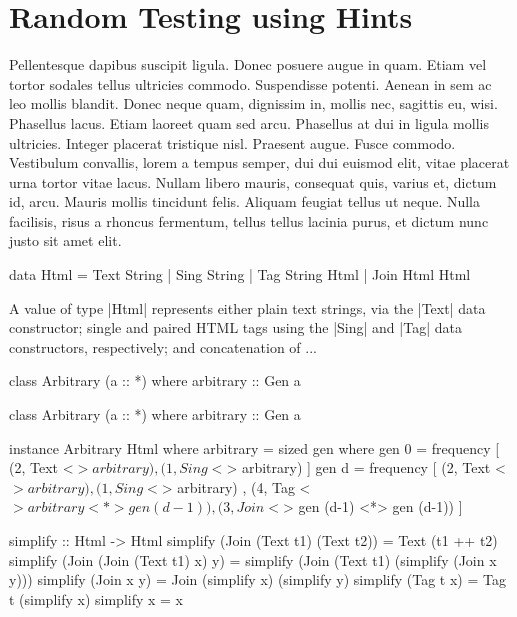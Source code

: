 \section{Random Testing using Hints}
\label{sec:sources}


Pellentesque dapibus suscipit ligula. Donec posuere augue in quam. Etiam vel
tortor sodales tellus ultricies commodo. Suspendisse potenti. Aenean in sem ac
leo mollis blandit. Donec neque quam, dignissim in, mollis nec, sagittis eu,
wisi. Phasellus lacus. Etiam laoreet quam sed arcu. Phasellus at dui in ligula
mollis ultricies. Integer placerat tristique nisl. Praesent augue. Fusce
commodo. Vestibulum convallis, lorem a tempus semper, dui dui euismod elit,
vitae placerat urna tortor vitae lacus. Nullam libero mauris, consequat quis,
varius et, dictum id, arcu. Mauris mollis tincidunt felis. Aliquam feugiat
tellus ut neque. Nulla facilisis, risus a rhoncus fermentum, tellus tellus
lacinia purus, et dictum nunc justo sit amet elit.

\begin{code}
data Html
  =  Text  String
  |  Sing  String
  |  Tag   String Html
  |  Join  Html Html
\end{code}

A value of type |Html| represents either plain text strings, via the |Text| data
constructor; single and paired HTML tags using the |Sing| and |Tag| data
constructors, respectively; and concatenation of ...

\begin{code}
class Arbitrary (a :: *) where
  arbitrary :: Gen a
\end{code}

\begin{code}
class Arbitrary (a :: *) where
  arbitrary :: Gen a
\end{code}

\begin{code}
instance Arbitrary Html where
  arbitrary = sized gen
    where
      gen 0 = frequency
        [  (2,  Text    <$> arbitrary)
        ,  (1,  Sing    <$> arbitrary) ]
      gen d = frequency
        [  (2,  Text    <$> arbitrary)
        ,  (1,  Sing    <$> arbitrary)
        ,  (4,  Tag     <$> arbitrary  <*> gen (d-1))
        ,  (3,  Join    <$> gen (d-1)  <*> gen (d-1)) ]
\end{code} %



\begin{code}
simplify :: Html -> Html
simplify (Join (Text t1) (Text t2))
  = Text (t1 ++ t2)
simplify (Join (Join (Text t1) x) y)
  = simplify (Join (Text t1) (simplify (Join x y)))
simplify (Join x y)
  = Join (simplify x) (simplify y)
simplify (Tag t x)
  = Tag t (simplify x)
simplify x = x
\end{code}
